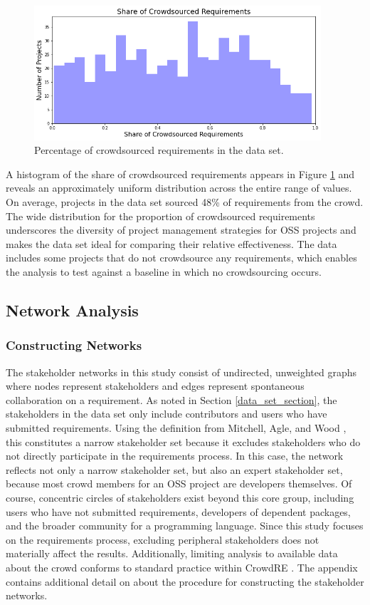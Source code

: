 \begin{figure}
  \includegraphics[width=0.95\textwidth]{crowd_pct_hist.png}
\caption{Percentage of crowdsourced requirements in the data set.}
\label{crowd_pct_hist}
\end{figure}


A histogram of the share of crowdsourced requirements appears in Figure \ref{crowd_pct_hist} and reveals an approximately uniform distribution across the entire range of values. On average, projects in the data set sourced 48\% of requirements from the crowd. The wide distribution for the proportion of crowdsourced requirements underscores the diversity of project management strategies for OSS projects and makes the data set ideal for comparing their relative effectiveness. The data includes some projects that do not crowdsource any requirements, which enables the analysis to test against a baseline in which no crowdsourcing occurs.


\subsection{Network Analysis}

\subsubsection{Constructing Networks}
\label{network_section}

The stakeholder networks in this study consist of undirected, unweighted graphs where nodes represent stakeholders and edges represent spontaneous collaboration on a requirement. As noted in Section \ref{data_set_section}, the stakeholders in the data set only include contributors and users who have submitted requirements. Using the definition from Mitchell, Agle, and Wood \cite{mitchell}, this constitutes a narrow stakeholder set because it excludes stakeholders who do not directly participate in the requirements process. In this case, the network reflects not only a narrow stakeholder set, but also an expert stakeholder set, because most crowd members for an OSS project are developers themselves. Of course, concentric circles of stakeholders exist beyond this core group, including users who have not submitted requirements, developers of dependent packages, and the broader community for a programming language. Since this study focuses on the requirements process, excluding peripheral stakeholders does not materially affect the results. Additionally, limiting analysis to available data about the crowd conforms to standard practice within CrowdRE \cite{khan}. The appendix contains additional detail on about the procedure for constructing the stakeholder networks.

